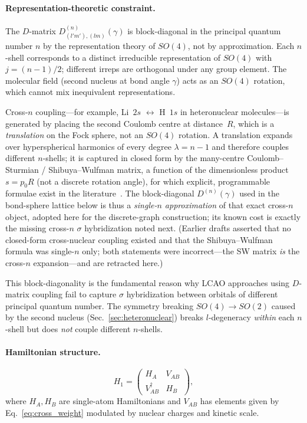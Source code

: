 \documentclass[aps,pra,twocolumn,superscriptaddress,longbibliography]{revtex4-2}
\theoremstyle{remark}
\theoremstyle{plain}
\begin{document}
\paragraph{Representation-theoretic constraint.}
The $D$-matrix $D^{(n)}_{(l'm'),(lm)}(\gamma)$ is block-diagonal in the
principal quantum number $n$ by the representation theory of $SO(4)$,
not by approximation.  Each $n$-shell corresponds to a distinct irreducible
representation of $SO(4)$ with $j = (n-1)/2$; different irreps are
orthogonal under any group element.  The molecular field (second nucleus at
bond angle $\gamma$) acts as an $SO(4)$ rotation, which cannot mix
inequivalent representations.

Cross-$n$ coupling---for example, Li~$2s$ $\leftrightarrow$ H~$1s$ in
heteronuclear molecules---is generated by placing the second Coulomb
centre at distance~$R$, which is a \emph{translation} on the Fock
sphere, not an $SO(4)$ rotation.  A translation expands over
hyperspherical harmonics of every degree $\lambda = n-1$ and therefore
couples different $n$-shells; it is captured in closed form by the
many-centre Coulomb--Sturmian / Shibuya--Wulfman matrix, a function of
the dimensionless product $s = p_0 R$ (not a discrete rotation angle),
for which explicit, programmable formulae exist in the
literature~\cite{Avery2004IJQC,RedWeatherford2004}.  The block-diagonal
$D^{(n)}(\gamma)$ used in the bond-sphere lattice below is thus a
\emph{single-$n$ approximation} of that exact cross-$n$ object, adopted
here for the discrete-graph construction; its known cost is exactly the
missing cross-$n$ $\sigma$ hybridization noted next.  (Earlier drafts
asserted that no closed-form cross-nuclear coupling existed and that the
Shibuya--Wulfman formula was single-$n$ only; both statements were
incorrect---the SW matrix \emph{is} the cross-$n$ expansion---and are
retracted here.)

This block-diagonality is the fundamental reason why LCAO approaches
using $D$-matrix coupling fail to capture $\sigma$ hybridization between
orbitals of different principal quantum number.  The symmetry breaking
$SO(4) \to SO(2)$ caused by the second nucleus
(Sec.~\ref{sec:heteronuclear}) breaks $l$-degeneracy \emph{within} each
$n$-shell but does \emph{not} couple different $n$-shells.

\paragraph{Hamiltonian structure.}
\begin{equation}
H_1 = \begin{pmatrix} H_A & V_{AB} \\ V_{AB}^\dagger & H_B \end{pmatrix},
\label{eq:H1_block}
\end{equation}
where $H_A, H_B$ are single-atom Hamiltonians and $V_{AB}$ has elements
given by Eq.~\eqref{eq:cross_weight} modulated by nuclear charges and
kinetic scale.
\end{document}
